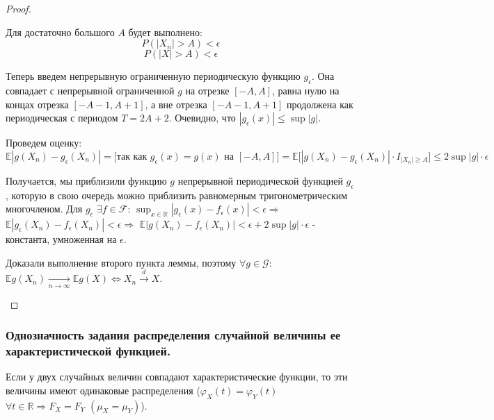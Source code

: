 \begin{proof}
\begin{itemize}
        Для достаточно большого $A$ будет выполнено:
        $$P(|X_n| > A) < \epsilon$$
        $$P(|X| > A) < \epsilon$$
        
        Теперь введем непрерывную ограниченную периодическую функцию $g_{\epsilon}$. Она совпадает с непрерывной ограниченной $g$ на отрезке $[-A, A]$, равна нулю на концах отрезка $[-A - 1, A + 1]$, а вне отрезка $[-A - 1, A + 1]$ продолжена как периодическая с периодом $T = 2A + 2$. Очевидно, что $|g_{\epsilon}(x)| \leq \sup|g|$.
        
        Проведем оценку:
        $$\mathbb{E}|g(X_n) - g_{\epsilon}(X_n)| = \Big[ \textrm{так как } g_{\epsilon}(x) = g(x) \textrm{ на } [-A, A] \Big] = \mathbb{E}\big[ |g(X_n) - g_{\epsilon}(X_n)| \cdot I_{|X_n| \geq A} \big] \leq 2\sup|g| \cdot \epsilon$$
        
        Получается, мы приблизили функцию $g$ непрерывной периодической функцией $g_{\epsilon}$, которую в свою очередь можно приблизить равномерным тригонометрическим многочленом. Для $g_{\epsilon}$ $\exists f \in \mathcal{F}$: $\sup_{x \in \mathbb{R}}|g_{\epsilon}(x) - f_{\epsilon}(x)| < \epsilon \Rightarrow$ $\mathbb{E}|g_{\epsilon}(X_n) - f_{\epsilon}(X_n)| < \epsilon \Rightarrow$ $\mathbb{E}|g(X_n) - f_{\epsilon}(X_n)| < \epsilon + 2\sup|g| \cdot \epsilon$ - константа, умноженная на $\epsilon$.
        
        Доказали выполнение второго пункта леммы, поэтому $\forall g \in \mathcal{G}$: $\mathbb{E}g(X_n) \xrightarrow[n \rightarrow \infty]{} \mathbb{E}g(X) \Leftrightarrow X_n \xrightarrow{d} X$.
    \end{itemize}
\end{proof}

\subsubsection{Однозначность задания распределения случайной величины ее характеристической функцией.}

\begin{theorem*}
    Если у двух случайных величин совпадают характеристические функции, то эти величины имеют одинаковые распределения ($\varphi_{X}(t) = \varphi_{Y}(t)$ $\forall t \in \mathbb{R} \Rightarrow F_X = F_Y$ $(\mu_X = \mu_Y)$).
\end{theorem*}

